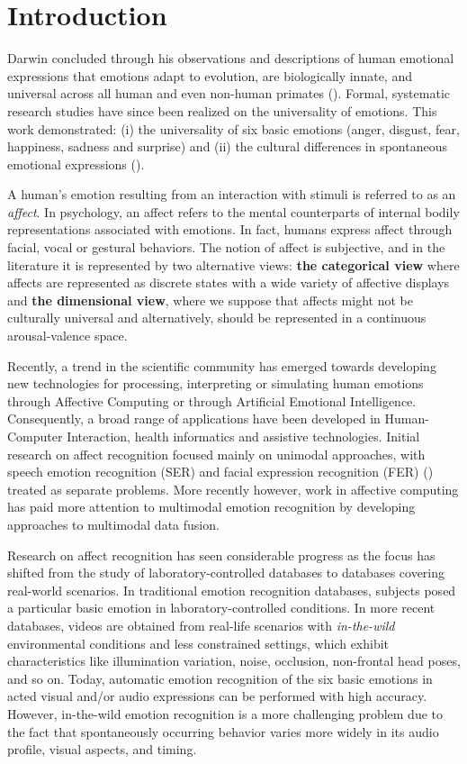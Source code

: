 \documentclass[times,twocolumn,final,authoryear]{elsarticle}
\begin{document}
\section{Introduction}
	\label{introduction}
	
	Darwin concluded through his observations and descriptions of human emotional expressions that emotions adapt to evolution, are biologically innate, and universal across all human and even non-human primates (\cite{Matsumoto2001}). Formal, systematic research studies have since been realized on the universality of emotions. This work demonstrated: (i) the universality of six basic emotions (anger, disgust, fear, happiness, sadness and surprise) and (ii) the cultural differences in spontaneous emotional expressions (\cite{Ekman1987}). 
	
	A human's emotion resulting from an interaction with stimuli is referred to as an \textit{affect}. In psychology, an affect refers to the mental counterparts of internal bodily representations associated with emotions. In fact, humans express affect through facial, vocal or gestural behaviors. The notion of affect is subjective, and in the literature it is represented by two alternative views: \textbf{the categorical view} where affects are represented as discrete states with a wide variety of affective displays and \textbf{the dimensional view}, where we suppose that affects might not be culturally universal and alternatively, should be represented in a continuous arousal-valence space.
	
	Recently, a trend in the scientific community has emerged towards developing new technologies for processing, interpreting or simulating human emotions through Affective Computing or through Artificial Emotional Intelligence. Consequently, a broad range of applications have been developed in Human-Computer Interaction, health informatics and assistive technologies. Initial research on affect recognition focused mainly on unimodal approaches, with speech emotion recognition (SER) and facial expression recognition (FER) (\cite{RouastSurvey}) treated as separate problems. More recently however, work in affective computing has paid more attention to multimodal emotion recognition by developing approaches to multimodal data fusion.
	
	Research on affect recognition has seen considerable progress as the focus has shifted from the study of laboratory-controlled databases to databases covering real-world scenarios. In traditional emotion recognition databases, subjects posed a particular basic emotion in laboratory-controlled conditions. In more recent databases, videos are obtained from real-life scenarios with \textit{in-the-wild} environmental conditions and less constrained settings, which exhibit characteristics like illumination variation, noise, occlusion, non-frontal head poses, and so on. Today, automatic emotion recognition of the six basic emotions in acted visual and/or audio expressions can be performed with high accuracy. However, in-the-wild emotion recognition is a more challenging problem due to the fact that spontaneously occurring behavior varies more widely in its audio profile, visual aspects, and timing.
	
\end{document}
